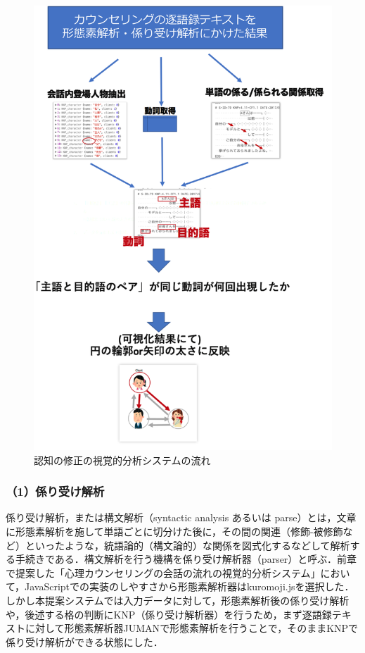 \documentclass[shuuron]{kuee}
\begin{document}
\begin{figure}
  \begin{center}
    \includegraphics[clip,width=13.0cm]{charaFlow.png}
  \end{center}
  \caption{認知の修正の視覚的分析システムの流れ}
  \label{fig:charaFlow}
\end{figure}





\subsubsection{（1）係り受け解析}


係り受け解析，または構文解析（syntactic analysis あるいは parse）とは，文章に形態素解析を施して単語ごとに切分けた後に，その間の関連（修飾-被修飾など）といったような，統語論的（構文論的）な関係を図式化するなどして解析する手続きである．構文解析を行う機構を係り受け解析器（parser）と呼ぶ．前章で提案した「心理カウンセリングの会話の流れの視覚的分析システム」において，JavaScriptでの実装のしやすさから形態素解析器はkuromoji.jsを選択した．しかし本提案システムでは入力データに対して，形態素解析後の係り受け解析や，後述する格の判断にKNP\cite{KNP}（係り受け解析器）を行うため，まず逐語録テキストに対して形態素解析器JUMAN\cite{juman}で形態素解析を行うことで，そのままKNPで係り受け解析ができる状態にした．
\end{document}
